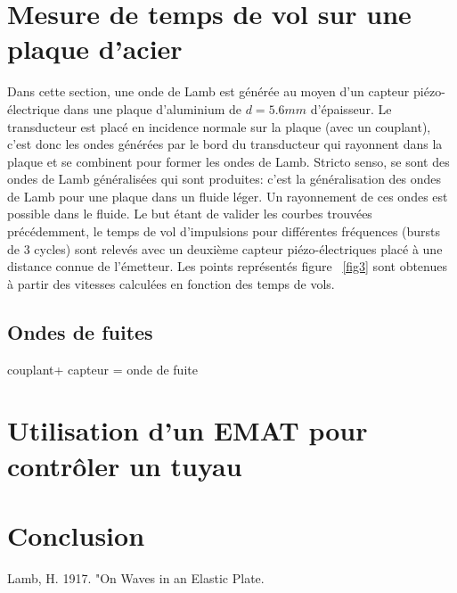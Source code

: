 \documentclass[twoside]{article}
\begin{document}
\begin{multicols}{2}

\section{Mesure de temps de vol sur une plaque d'acier}
Dans cette section, une onde de Lamb est générée au moyen d'un capteur piézo-électrique dans une plaque d'aluminium de $d = 5.6mm$ d'épaisseur. Le transducteur est placé en incidence normale sur la plaque (avec un couplant), c'est donc les ondes générées par le bord du transducteur qui rayonnent dans la plaque et se combinent pour former les ondes de Lamb.
\bigskip
Stricto senso, se sont des ondes de Lamb généralisées qui sont produites: c'est la généralisation des ondes de Lamb pour une plaque dans un fluide léger. Un rayonnement de ces ondes est possible dans le fluide. 
Le but étant de valider les courbes trouvées précédemment, le temps de vol d'impulsions pour différentes fréquences (bursts de 3 cycles) sont relevés avec un deuxième capteur piézo-électriques placé à une distance connue de l'émetteur. Les points représentés figure ~\ref{fig3} sont obtenues à partir des vitesses calculées en fonction des temps de vols.
%

\subsection{Ondes de fuites}
couplant+ capteur = onde de fuite



\section{Utilisation d'un EMAT pour contrôler un tuyau}




\section{Conclusion}

\begin{thebibliography}{99} %

Lamb, H. 1917.
\newblock"On Waves in an Elastic Plate.
 
\end{thebibliography}


\end{multicols}
\end{document}
